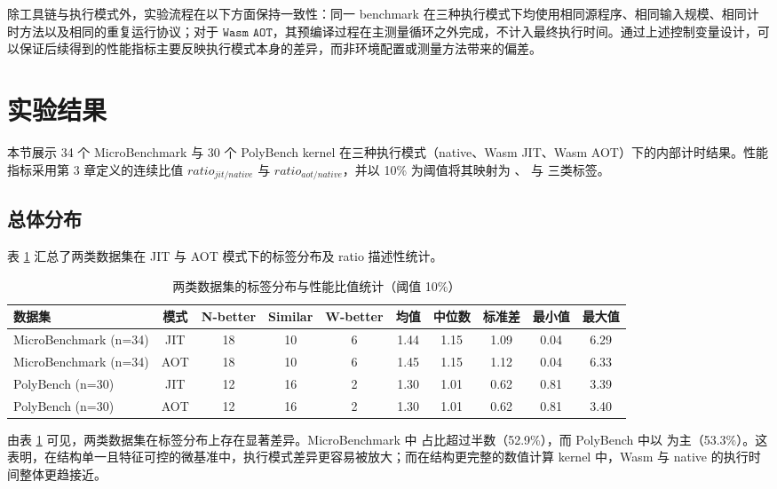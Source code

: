 除工具链与执行模式外，实验流程在以下方面保持一致性：同一 benchmark 在三种执行模式下均使用相同源程序、相同输入规模、相同计时方法以及相同的重复运行协议；对于 $\texttt{Wasm AOT}$，其预编译过程在主测量循环之外完成，不计入最终执行时间。通过上述控制变量设计，可以保证后续得到的性能指标主要反映执行模式本身的差异，而非环境配置或测量方法带来的偏差。



\section{实验结果}

本节展示 34 个 MicroBenchmark 与 30 个 PolyBench kernel 在三种执行模式（native、Wasm JIT、Wasm AOT）下的内部计时结果。性能指标采用第 3 章定义的连续比值 $ratio_{jit/native}$ 与 $ratio_{aot/native}$，并以 10\% 为阈值将其映射为 、 与  三类标签。

\subsection{总体分布}

表 \ref{tab:overall_stats} 汇总了两类数据集在 JIT 与 AOT 模式下的标签分布及 ratio 描述性统计。


\begin{table}[htbp]
\centering
\caption{两类数据集的标签分布与性能比值统计（阈值 10\%）}
\small
\setlength{\tabcolsep}{3pt}
\begin{tabular}{lccccccccc}
\toprule
数据集 & 模式 & N-better & Similar & W-better & 均值 & 中位数 & 标准差 & 最小值 & 最大值 \\
\midrule
MicroBenchmark (n=34) & JIT & 18 & 10 & 6 & 1.44 & 1.15 & 1.09 & 0.04 & 6.29 \\
MicroBenchmark (n=34) & AOT & 18 & 10 & 6 & 1.45 & 1.15 & 1.12 & 0.04 & 6.33 \\
PolyBench (n=30) & JIT & 12 & 16 & 2 & 1.30 & 1.01 & 0.62 & 0.81 & 3.39 \\
PolyBench (n=30) & AOT & 12 & 16 & 2 & 1.30 & 1.01 & 0.62 & 0.81 & 3.40 \\
\bottomrule
\end{tabular}
\label{tab:overall_stats}
\end{table}

由表 \ref{tab:overall_stats} 可见，两类数据集在标签分布上存在显著差异。MicroBenchmark 中  占比超过半数（52.9\%），而 PolyBench 中以  为主（53.3\%）。这表明，在结构单一且特征可控的微基准中，执行模式差异更容易被放大；而在结构更完整的数值计算 kernel 中，Wasm 与 native 的执行时间整体更趋接近。

